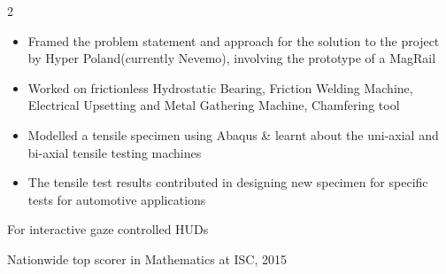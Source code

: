 \documentclass[10pt,a4paper,withhyper]{altacv}
\begin{document}
\begin{paracol}{2}
\begin{itemize}
\item Framed the problem statement and approach for the solution to the project by Hyper Poland(currently Nevemo), involving the prototype of a MagRail
\end{itemize}

\divider


\begin{itemize}
\item Worked on frictionless Hydrostatic Bearing, Friction Welding Machine, Electrical Upsetting and Metal Gathering Machine, Chamfering tool
\end{itemize}

\divider


\begin{itemize}
\item Modelled a tensile specimen using Abaqus \& learnt about the uni-axial and bi-axial tensile testing machines
\item The tensile test results contributed in designing new specimen for specific tests for automotive applications
\end{itemize}

For interactive gaze controlled HUDs

\divider
{}

Nationwide top scorer in Mathematics at ISC, 2015




\end{paracol}
\end{document}
